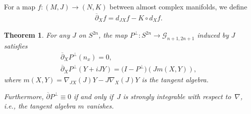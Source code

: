 \documentclass[pdftex]{sigma}
\newtheorem{thm}{Theorem}[section]
\numberwithin{equation}{section}
\newcommand{\cG}{{\mathcal G}}
\begin{document}
For a map $f\colon (M,J) \to (N,K) $ between almost complex manifolds, we define
\begin{gather*}
\overline{\partial}_X f = d_{JX} f - K \circ d_X f.
\end{gather*}

\begin{thm} \label{thm;delbarPperp}
For any $J$ on $S^{2n}$, the map $P^\perp\colon S^{2n} \to \cG_{n+1,2n+1}$ induced by $J$ satisfies
\begin{gather*}
\overline{\partial}_X P^\perp (n_x) = 0, \\
\overline{\partial}_X P^\perp (Y+iJY) = \big( I - P^\perp\big) (J m(X,Y)),
\end{gather*}
where $m(X,Y) = \nabla_{JX} (J)Y - J \nabla_X (J) Y$ is the tangent algebra.

Furthermore, $\overline{\partial} P^\perp \equiv 0$ if and only if~$J $ is strongly integrable with respect to~$\nabla$, i.e., the tangent algebra $m$ vanishes.
\end{thm}
\end{document}
